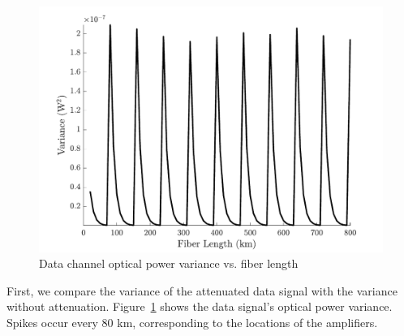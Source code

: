 %
\begin{figure}[htb]
	\centering
	\includegraphics[scale=0.9]{img/ACalcVar}
	\caption{Data channel optical power variance vs. fiber length} \label{fig:ACalcVar}
\end{figure}
%
First, we compare the variance of the attenuated data signal with the variance without attenuation. Figure~\ref{fig:ACalcVar} shows the data signal's optical power variance. Spikes occur every $80$ km, corresponding to the locations of the amplifiers.

